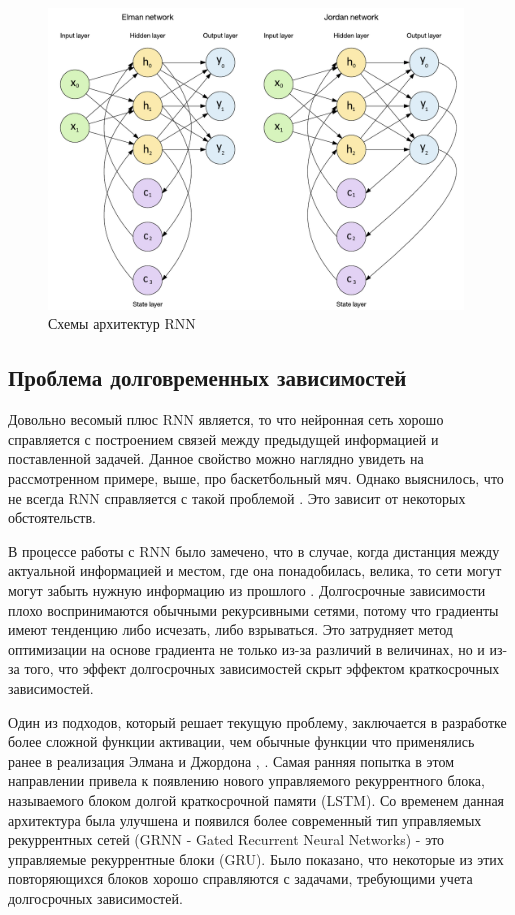     \begin{figure}[h]
		\centering
		\captionsetup{justification=centering}
		\includegraphics[width=0.98\textwidth]{img/RNN.png}
		\caption{Схемы архитектур RNN}
	\end{figure}
	
	\subsection{Проблема долговременных зависимостей}
	
	Довольно весомый плюс RNN является, то что нейронная сеть хорошо справляется с построением связей между предыдущей информацией и поставленной задачей. Данное свойство можно наглядно увидеть на рассмотренном примере, выше, про баскетбольный мяч. Однако выяснилось, что не всегда RNN справляется с такой проблемой \cite{2}. Это зависит от некоторых обстоятельств.

	В процессе работы с RNN было замечено, что в случае, когда дистанция между актуальной информацией и местом, где она понадобилась, велика, то сети могут могут забыть нужную информацию из прошлого \cite{2}. Долгосрочные зависимости плохо воспринимаются обычными рекурсивными сетями, потому что градиенты имеют тенденцию либо исчезать, либо взрываться. Это затрудняет метод оптимизации на основе градиента не только из-за различий в величинах, но и из-за того, что эффект долгосрочных зависимостей скрыт эффектом краткосрочных зависимостей. 
	
	Один из подходов, который решает текущую проблему, заключается в разработке более сложной функции активации, чем обычные функции что применялись ранее в реализация Элмана и Джордона \cite{1}, \cite{4}. Самая ранняя попытка в этом направлении привела к появлению нового управляемого рекуррентного блока, называемого блоком долгой краткосрочной памяти (LSTM)\cite{2}. Со временем данная архитектура была улучшена и появился более современный тип управляемых рекуррентных сетей (GRNN - Gated Recurrent Neural Networks) - это управляемые рекуррентные блоки (GRU)\cite{3}. Было показано, что некоторые из этих повторяющихся блоков хорошо справляются с задачами, требующими учета долгосрочных зависимостей.
	
